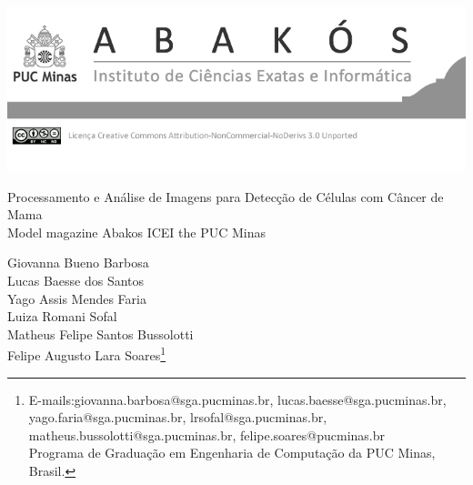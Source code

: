 \documentclass[a4paper,12pt,Times]{article}
\makeatletter
\newcommand{\monog}{Processamento e Análise de Imagens para Detecção de Células com Câncer de Mama}
\newcommand{\monogES}{Model magazine Abakos ICEI the PUC Minas}
\newcommand{\origem}{Brasil}
\newcommand{\AutorA}{Giovanna Bueno Barbosa}
\newcommand{\EmailA}{giovanna.barbosa@sga.pucminas.br}
\newcommand{\AutorB}{Lucas Baesse dos Santos}
\newcommand{\EmailB}{lucas.baesse@sga.pucminas.br}
\newcommand{\AutorC}{Yago Assis Mendes Faria}
\newcommand{\EmailC}{yago.faria@sga.pucminas.br}
\newcommand{\AutorD}{Luiza Romani Sofal}
\newcommand{\EmailD}{lrsofal@sga.pucminas.br}
\newcommand{\AutorE}{Matheus Felipe Santos Bussolotti}
\newcommand{\EmailE}{matheus.bussolotti@sga.pucminas.br}
\newcommand{\AutorF}{Felipe Augusto Lara Soares}
\newcommand{\EmailF}{felipe.soares@pucminas.br}
\newcommand{\Curso}{Programa de Graduação em Engenharia de Computação da PUC Minas}
\newcommand{\keyword}[1]{\textsf{#1}}
\makeatother
\begin{document}
\begin{flushleft}

\begin{minipage} [c][5cm][b]{16.5cm} 
\includegraphics[scale=2.8]{figuras/pucmg.png} 
\end{minipage}

 \vspace{0cm} {
 \singlespacing \Large{\monog {} \\ }
  \normalsize{\monogES}
 }
\end{flushleft}
\begin{flushright}
\singlespacing 

\normalsize{\AutorA \\ \AutorB \\ \AutorC \\ \AutorD \\ \AutorE \\ \AutorF\footnote{E-mails:\EmailA, \EmailB, \EmailC, \EmailD, \EmailE, \EmailF \\ \Curso, \origem.}} \\

\end{flushright}
\thispagestyle{empty}

\begin{abstract}
\noindent

O câncer de mama é a doença mais comum entre as mulheres do mundo e também o segundo tipo de tumor maligno mais incidente no Brasil. De acordo com dados do Instituto Nacional de Câncer, existe uma previsão de 74 mil novos casos por ano, até 2025. Sem uma causa específica, a doença tem aumento no risco de se desenvolver a partir de fatores genéticos, hereditários, idade, entre outros. Diante do avanço computacional e a invenção de dispositivos termoelétricos que estabelecem a temperatura em circuitos elétricos através de radiação térmica, é possível identificar células com câncer utilizando imagens termográficas. Tendo isso em vista, o presente artigo aplica a técnica de processamento e análise de imagens para detectar se o conjunto de células são cancerosas. Para isso, foram utilizados métodos de treinamento de Inteligência Artificial usando Aprendizado por Transferência. O método proposto foi utilizado em experimentos na base \textit{Visual Lab DMR} em 4530 imagens, conseguindo uma acurácia de 70,95\%.
\\\textbf{\keyword{Palavras-chave: }} Câncer de Mama. Imagens Termográficas. Inteligência Artificial.
\end{abstract}
\end{document}
